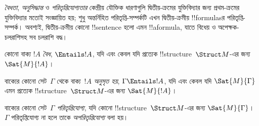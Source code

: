 \documentclass[../../../include/open-logic-section]{subfiles}
\begin{document}

\begin{explain}
\emph{বৈধতা}, \emph{অনুসিদ্ধান্ত} ও \emph{পরিতৃপ্তিযোগ্যতার} কেন্দ্রীয়
যৌক্তিক ধারণাগুলি দ্বিতীয়-ক্রমের যুক্তিবিদ্যার জন্য প্রথম-ক্রমের
যুক্তিবিদ্যার মতোই সংজ্ঞায়িত হয়; শুধু অন্তর্নিহিত পরিতৃপ্তি-সম্পর্কটি
এখন দ্বিতীয়-ক্রমীয় !!{formula}sর পরিতৃপ্তি-সম্পর্ক। অবশ্যই,
দ্বিতীয়-ক্রমীয় কোনো !!{sentence} হলো এমন !!a{formula}, যাতে বিধেয় ও
অপেক্ষক-চলরাশিসহ সব চলরাশি বদ্ধ।
\end{explain}

\begin{defn}[বৈধতা]
কোনো বাক্য $!A$ \emph{বৈধ}, $\Entails !A$, যদি এবং কেবল যদি প্রত্যেক
!!{structure}~$\Struct M$-এর জন্য $\Sat{M}{!A}$।
\end{defn}

\begin{defn}[অনুসিদ্ধান্ত]
বাক্যের কোনো সেট~$\Gamma$ থেকে বাক্য~$!A$ \emph{অনুসৃত হয়}, $\Gamma
\Entails !A$, যদি এবং কেবল যদি $\Sat{M}{\Gamma}$ এমন প্রত্যেক
!!{structure}~$\Struct M$-এর জন্য $\Sat{M}{!A}$।
\end{defn}

\begin{defn}[পরিতৃপ্তিযোগ্যতা]
বাক্যের কোনো সেট~$\Gamma$ \emph{পরিতৃপ্তিযোগ্য}, যদি কোনো
!!{structure}~$\Struct M$-এর জন্য $\Sat{M}{\Gamma}$। $\Gamma$
পরিতৃপ্তিযোগ্য না হলে তাকে \emph{অপরিতৃপ্তিযোগ্য} বলা হয়।
\end{defn}
\end{document}
